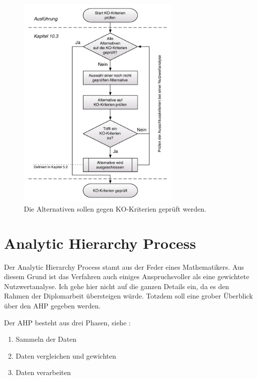   \begin{figure}[htb]
    \begin{center}
      \includegraphics[width=0.7\textwidth]{./image/rahmenbedingungenPruefen.pdf}
      \caption{Die Alternativen sollen gegen KO-Kriterien geprüft werden.}
      \label{img:rahmenbedingungenPruefen}
    \end{center}
  \end{figure}
  
  \clearpage
 
  \section{Analytic Hierarchy Process}
  
  Der Analytic Hierarchy Process stamt aus der Feder eines Mathematikers. Aus
  diesem Grund ist das Verfahren auch einiges Anspruchsvoller als eine
  gewichtete Nutzwertanalyse. Ich gehe hier nicht auf die ganzen Details ein, da
  es den Rahmen der Diplomarbeit übersteigen würde. Totzdem soll eine grober
  Überblick über den \ac{AHP} gegeben werden.
  
  Der \ac{AHP} besteht aus drei Phasen, siehe \cite{AnalyticHierarchyProcess}: 
  
  \begin{enumerate}
    \item Sammeln der Daten
    \item Daten vergleichen und gewichten
    \item Daten verarbeiten
  \end{enumerate}
  
